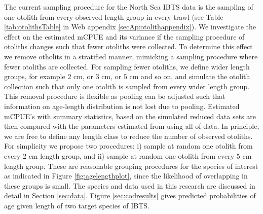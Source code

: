\documentclass[a4paper 12pt]{article}
\numberwithin{equation}{section}
\begin{document}
The current sampling procedure for the North Sea IBTS data is the sampling of one otolith from every observed length group in every trawl (see Table \ref{tab:otolithsTable} in Web appendix \ref{secAp:otolithappendix}). We investigate the effect on the estimated mCPUE and its variance if the sampling procedure of otoliths changes such that fewer otoliths were collected. To determine this effect we remove otholits in a stratified manner, mimicking a sampling procedure where fewer otoliths are collected. For sampling fewer otoliths, we define wider length groups, for example $2$ cm, or $3$ cm, or $5$ cm and so on,  and simulate the otolith  collection such that only one otolith is sampled from every wider length group. This removal procedure is flexible as pooling can be adjusted such that information on age-length distribution is not lost due to pooling. Estimated mCPUE's with summary statistics, based on the simulated reduced data sets are then compared with the parameters estimated from using all of data. In principle, we are free to define any length class to reduce the number of observed otoliths. For simplicity we propose two procedures: i) sample at random  one otolith from every 2 cm length group, and ii) sample at random one otolith from every 5 cm length group. These are reasonable grouping procedures for the species of interest as indicated in Figure \ref{fig:agelengthplot}, since the likelihood of overlapping in these groups is small. The species and data used in this research are discussed in detail in Section \ref{sec:data}. Figure \ref{sec:codresults} gives predicted probabilities of age given length of two target species of IBTS.
\end{document}
